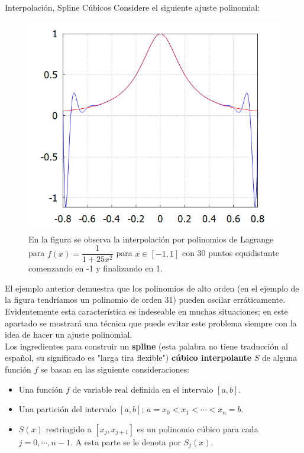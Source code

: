 \begin{frame}[allowframebreaks]{Interpolación, Spline Cúbicos}
\indent Considere el siguiente ajuste polinomial:
\begin{figure}[H]
\begin{center}
\includegraphics[scale=0.7]{Imagen21}
\end{center}
\caption{En la figura se observa la interpolación por polinomios de Lagrange para $f(x)=\dfrac{1}{1+25x^2}$ para $x\in[-1,1]$ con 30 puntos equidistante comenzando en -1 y finalizando en 1.}
\end{figure}
\indent El ejemplo anterior demuestra que los polinomios de alto orden (en el ejemplo de la figura tendríamos un polinomio de orden 31)  pueden oscilar erráticamente. Evidentemente esta característica es indeseable en muchas situaciones; en este apartado se mostrará una técnica que puede evitar este problema siempre con la idea de hacer un ajuste polinomial. \\
\indent Los ingredientes para construir un \textbf{spline} (esta palabra no tiene traducción al español, su significado es "larga tira flexible") \textbf{cúbico interpolante} $S$ de alguna función $f$ se basan en las siguiente consideraciones:
\begin{itemize}
\item Una función $f$ de variable real definida en el intervalo $[a,b]$.
\item Una partición del intervalo $[a,b]$; $a=x_0<x_1<\cdots<x_n=b$.
\item $S(x)$ restringido a $[x_j,x_{j+1}]$ es un polinomio cúbico para cada $j=0,\cdots, n-1$. A esta parte se le denota por $S_j(x)$.

\end{itemize}
\end{frame}
